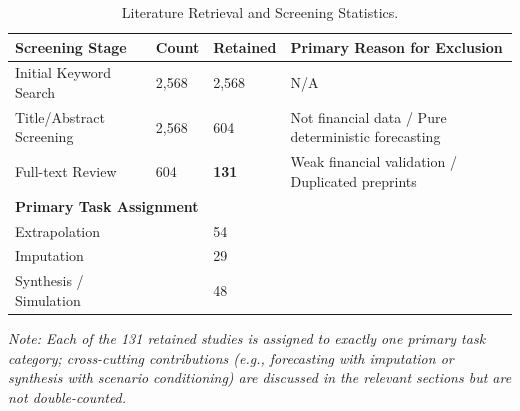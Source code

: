 \begin{table}[!ht]
\centering
\scriptsize
\caption{Literature Retrieval and Screening Statistics.}
\label{tab:retrieval_stats}
\begin{tabular}{p{5cm} p{2cm} p{2cm} p{3cm}}
\toprule
\textbf{Screening Stage} & \textbf{Count} & \textbf{Retained} & \textbf{Primary Reason for Exclusion} \\
\midrule
Initial Keyword Search & 2,568 & 2,568 & N/A \\
Title/Abstract Screening & 2,568 & 604 & Not financial data / Pure deterministic forecasting \\
Full-text Review & 604 & \textbf{131} & Weak financial validation / Duplicated preprints \\
\midrule
\multicolumn{4}{l}{\textbf{Primary Task Assignment}} \\
\quad Extrapolation & & 54 & \\
\quad Imputation & & 29 & \\
\quad Synthesis / Simulation & & 48 & \\
\bottomrule
\end{tabular}
\begin{flushleft}
\textit{Note: Each of the 131 retained studies is assigned to exactly one primary task category; cross-cutting contributions (e.g., forecasting with imputation or synthesis with scenario conditioning) are discussed in the relevant sections but are not double-counted.}
\end{flushleft}
\end{table}
